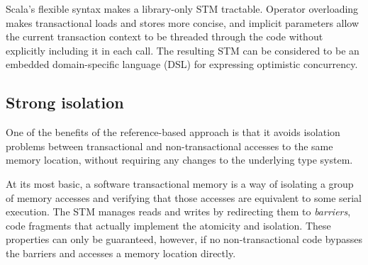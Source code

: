Scala's flexible syntax makes a library-only STM tractable.  Operator
overloading makes transactional loads and stores more concise,
and implicit parameters allow the current transaction context to be
threaded through the code without explicitly including it in each call.
The resulting STM can be considered to be an embedded domain-specific
language (DSL) for expressing optimistic concurrency.



\subsection{Strong isolation}

One of the benefits of the reference-based approach is that it avoids
isolation problems between transactional and non-transactional accesses to
the same memory location, without requiring any changes to the underlying
type system.

At its most basic, a software transactional memory is a way of isolating
a group of memory accesses and verifying that those accesses are
equivalent to some serial execution.  The STM manages reads and writes
by redirecting them to \textit{barriers}, code fragments that actually
implement the atomicity and isolation.  These properties can only be
guaranteed, however, if no non-transactional code bypasses the barriers
and accesses a memory location directly.

